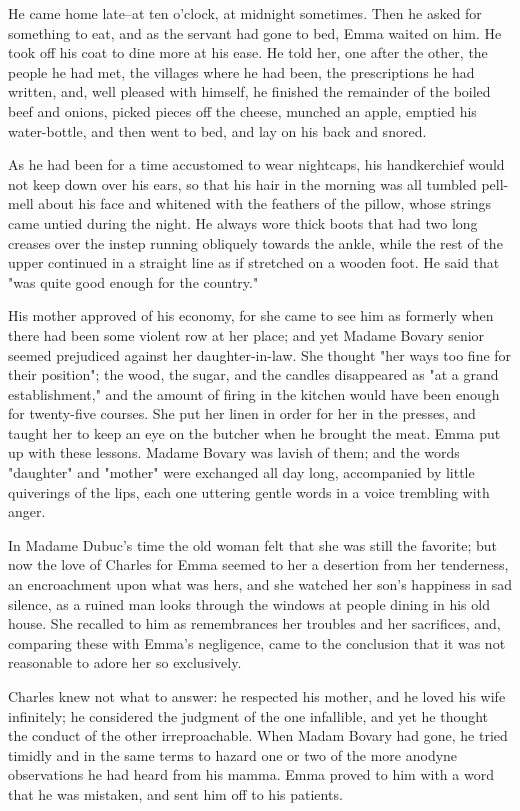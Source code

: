 \documentclass{tufte-book}
\begin{document}
He came home late--at ten o'clock, at midnight sometimes. Then he asked
for something to eat, and as the servant had gone to bed, Emma waited
on him. He took off his coat to dine more at his ease. He told her, one
after the other, the people he had met, the villages where he had been,
the prescriptions he had written, and, well pleased with himself, he
finished the remainder of the boiled beef and onions, picked pieces off
the cheese, munched an apple, emptied his water-bottle, and then went to
bed, and lay on his back and snored.

As he had been for a time accustomed to wear nightcaps, his handkerchief
would not keep down over his ears, so that his hair in the morning was
all tumbled pell-mell about his face and whitened with the feathers of
the pillow, whose strings came untied during the night. He always wore
thick boots that had two long creases over the instep running obliquely
towards the ankle, while the rest of the upper continued in a straight
line as if stretched on a wooden foot. He said that "was quite good
enough for the country."

His mother approved of his economy, for she came to see him as formerly
when there had been some violent row at her place; and yet Madame Bovary
senior seemed prejudiced against her daughter-in-law. She thought "her
ways too fine for their position"; the wood, the sugar, and the candles
disappeared as "at a grand establishment," and the amount of firing in
the kitchen would have been enough for twenty-five courses. She put her
linen in order for her in the presses, and taught her to keep an eye on
the butcher when he brought the meat. Emma put up with these lessons.
Madame Bovary was lavish of them; and the words "daughter" and "mother"
were exchanged all day long, accompanied by little quiverings of the
lips, each one uttering gentle words in a voice trembling with anger.

In Madame Dubuc's time the old woman felt that she was still the
favorite; but now the love of Charles for Emma seemed to her a desertion
from her tenderness, an encroachment upon what was hers, and she watched
her son's happiness in sad silence, as a ruined man looks through
the windows at people dining in his old house. She recalled to him as
remembrances her troubles and her sacrifices, and, comparing these with
Emma's negligence, came to the conclusion that it was not reasonable to
adore her so exclusively.

Charles knew not what to answer: he respected his mother, and he loved
his wife infinitely; he considered the judgment of the one infallible,
and yet he thought the conduct of the other irreproachable. When Madam
Bovary had gone, he tried timidly and in the same terms to hazard one or
two of the more anodyne observations he had heard from his mamma. Emma
proved to him with a word that he was mistaken, and sent him off to his
patients.
\end{document}
